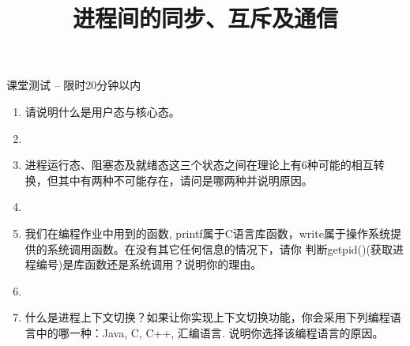 \documentclass[xcolor=svgnames]{beamer}
\begin{document}
\begin{CJK*}{UTF8}{gbsn}


\title{进程间的同步、互斥及通信}


\begin{frame}{课堂测试 -- 限时20分钟以内}
\begin{enumerate}
\item 请说明什么是用户态与核心态。
\item[]
\item 进程运行态、阻塞态及就绪态这三个状态之间在理论上有6种可能的相互转换，但其中有两种不可能存在，请问是哪两种并说明原因。
\item[]
\item 我们在编程作业中用到的函数, printf属于C语言库函数，write属于操作系统提供的系统调用函数。在没有其它任何信息的情况下，请你
判断getpid()(获取进程编号)是库函数还是系统调用？说明你的理由。
\item[]
\item 什么是进程上下文切换？如果让你实现上下文切换功能，你会采用下列编程语言中的哪一种：Java, C, C++, 汇编语言.
说明你选择该编程语言的原因。
\end{enumerate}
\end{frame}



\end{CJK*}
\end{document}

